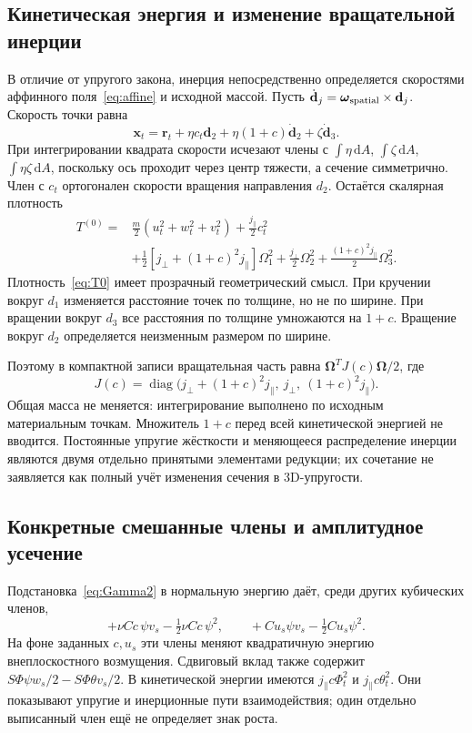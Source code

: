 \documentclass[11pt,a4paper]{article}
\newcommand{\dd}{\,\mathrm d}
\newcommand{\Om}{\boldsymbol\Omega}
\begin{document}
\subsection{Кинетическая энергия и изменение вращательной инерции}
В отличие от упругого закона, инерция непосредственно определяется скоростями аффинного поля~\eqref{eq:affine} и исходной массой. Пусть $\dot{\mathbf d}_j=\boldsymbol\omega_{\rm spatial}\times\mathbf d_j$. Скорость точки равна
\[
\mathbf x_t=\mathbf r_t+\eta c_t\mathbf d_2
+\eta(1+c)\dot{\mathbf d}_2+\zeta\dot{\mathbf d}_3.
\]
При интегрировании квадрата скорости исчезают члены с $\int\eta\dd A$, $\int\zeta\dd A$, $\int\eta\zeta\dd A$, поскольку ось проходит через центр тяжести, а сечение симметрично. Член с $c_t$ ортогонален скорости вращения направления $d_2$. Остаётся скалярная плотность
\begin{equation}
\begin{aligned}
T^{(0)}={}&\tfrac m2(u_t^2+w_t^2+v_t^2)+\tfrac{j_\parallel}{2}c_t^2\\
&+\tfrac12[j_\perp+(1+c)^2j_\parallel]\Omega_1^2
+\tfrac{j_\perp}{2}\Omega_2^2
+\tfrac{(1+c)^2j_\parallel}{2}\Omega_3^2.
\end{aligned}
\label{eq:T0}
\end{equation}
Плотность~\eqref{eq:T0} имеет прозрачный геометрический смысл. При кручении вокруг $d_1$ изменяется расстояние точек по толщине, но не по ширине. При вращении вокруг $d_3$ все расстояния по толщине умножаются на $1+c$. Вращение вокруг $d_2$ определяется неизменным размером по ширине.

Поэтому в компактной записи вращательная часть равна $\Om^TJ(c)\Om/2$, где
\[
J(c)=\operatorname{diag}\bigl(j_\perp+(1+c)^2j_\parallel,\ j_\perp,\ (1+c)^2j_\parallel\bigr).
\]
Общая масса не меняется: интегрирование выполнено по исходным материальным точкам. Множитель $1+c$ перед всей кинетической энергией не вводится. Постоянные упругие жёсткости и меняющееся распределение инерции являются двумя отдельно принятыми элементами редукции; их сочетание не заявляется как полный учёт изменения сечения в 3D-упругости.

\subsection{Конкретные смешанные члены и амплитудное усечение}
Подстановка~\eqref{eq:Gamma2} в нормальную энергию даёт, среди других кубических членов,
\[
+\nu Cc\,\psi v_s-\tfrac12\nu Cc\,\psi^2,
\qquad +C u_s\psi v_s-\tfrac12C u_s\psi^2.
\]
На фоне заданных $c,u_s$ эти члены меняют квадратичную энергию внеплоскостного возмущения. Сдвиговый вклад также содержит $S\Phi\psi w_s/2-S\Phi\theta v_s/2$. В кинетической энергии имеются $j_\parallel c\Phi_t^2$ и $j_\parallel c\theta_t^2$. Они показывают упругие и инерционные пути взаимодействия; один отдельно выписанный член ещё не определяет знак роста.
\end{document}
